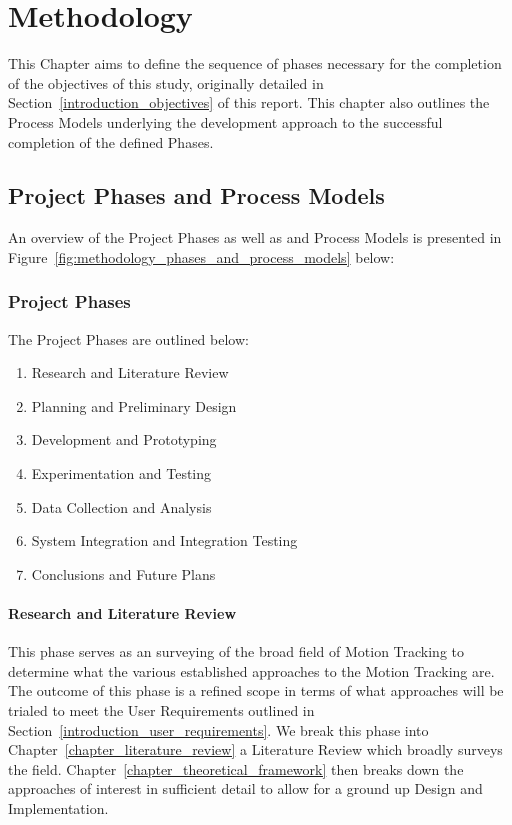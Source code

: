 \chapter{Methodology}\label{methodology}
This Chapter aims to define the sequence of phases necessary for the completion
of the objectives of this study, originally detailed in Section~\ref{introduction_objectives} of this report.
This chapter also outlines the Process Models underlying the development
approach to the successful completion of the defined Phases.

\section{Project Phases and Process Models}
An overview of the Project Phases as well as and Process Models is presented in
Figure~\ref{fig:methodology_phases_and_process_models} below:

\subsection{Project Phases}
The Project Phases are outlined below:
\begin{enumerate}
    \item Research and Literature Review
    \item Planning and Preliminary Design
    \item Development and Prototyping 
    \item Experimentation and Testing
    \item Data Collection and Analysis
    \item System Integration and Integration Testing
    \item Conclusions and Future Plans
\end{enumerate}

\subsubsection{Research and Literature Review}
This phase serves as an surveying of the broad field of Motion Tracking to
determine what the various established approaches to the Motion Tracking are.
The outcome of this phase is a refined scope in terms of what approaches will be
trialed to meet the User Requirements outlined in
Section~\ref{introduction_user_requirements}. We break this phase into
Chapter~\ref{chapter_literature_review} a Literature Review which broadly
surveys the field. Chapter~\ref{chapter_theoretical_framework} then breaks down
the approaches of interest in sufficient detail to allow for a ground up Design
and Implementation.

